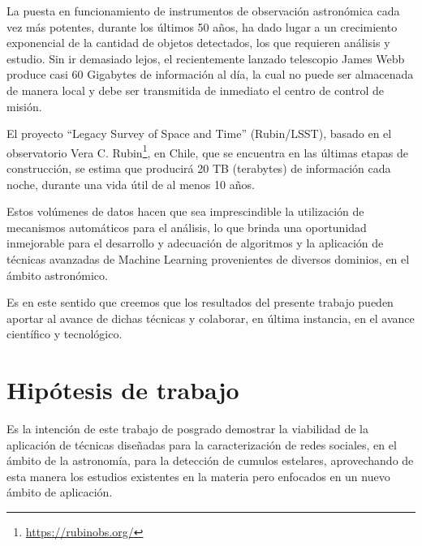 \documentclass[
	11pt,oneside,a4paper,
	headsepline,footsepline,
	fleqn,
]{memoir}
\begin{document}
La puesta en funcionamiento de instrumentos de observación astronómica cada vez más potentes, durante los últimos 50 años, ha dado lugar a un crecimiento exponencial de la cantidad de objetos detectados, los que requieren análisis y estudio. Sin ir demasiado lejos, el recientemente lanzado telescopio James Webb produce casi 60 Gigabytes de información al día, la cual no puede ser almacenada de manera local y debe ser transmitida de inmediato el centro de control de misión\cite{webdata}.

El proyecto ``Legacy Survey of Space and Time'' (Rubin/LSST), basado en el observatorio Vera C. Rubin\footnote{\url{https://rubinobs.org/}}, en Chile, que se encuentra en las últimas etapas de construcción, se estima que producirá 20 TB (terabytes) de información cada noche, durante una vida útil de al menos 10 años\cite{Telescope2021Jul}.

Estos volúmenes de datos hacen que sea imprescindible la utilización de mecanismos automáticos para el análisis, lo que brinda una oportunidad inmejorable para el desarrollo y adecuación de algoritmos y la aplicación de técnicas avanzadas de Machine Learning provenientes de diversos dominios, en el ámbito astronómico.

Es en este sentido que creemos que los resultados del presente trabajo pueden aportar al avance de dichas técnicas y colaborar, en última instancia, en el avance científico y tecnológico.



\section {Hipótesis de trabajo}

Es la intención de este trabajo de posgrado demostrar la viabilidad de la aplicación de técnicas diseñadas para la caracterización de redes sociales, en el ámbito de la astronomía, para la detección de cumulos estelares, aprovechando de esta manera los estudios existentes en la materia pero enfocados en un nuevo ámbito de aplicación.
\end{document}
